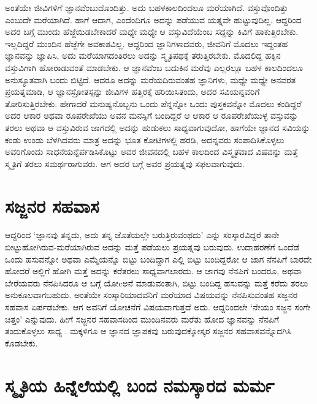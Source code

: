 ಅಂತೆಯೇ ಜೀವಿಗಳಿಗೆ ಜ್ಞಾನವೆಂಬುದೊಂದಿತ್ತು. ಅದು ಬಹಳಕಾಲದಿಂದಲೂ ಮರೆಯಾಗಿದೆ. ವಸ್ತುವೊಂದಿತ್ತು ಎಂಬುದೇ ಮರೆಯಾಗಿದೆ. ಹಾಗೆ ಆದಾಗ, ಎಂದೆಂದಿಗೂ ಅದನ್ನು ಪಡೆಯುವ ಯತ್ನವೇ ಹುಟ್ಟುವುದಿಲ್ಲ. ಆದ್ದರಿಂದ ಅದರ ಬಗ್ಗೆ ಮುಂದು ಹೆಜ್ಜೆಯಿಡಬೇಕಾದರೆ ಮಧ್ಯೇ ಮಧ್ಯೇ ಆ ವಸ್ತುವಿದೆಯೆಂಬ ಸದ್ದನ್ನು ಕಿವಿಗೆ ಹಾಕುತ್ತಿರಬೇಕು. ಇಲ್ಲದಿದ್ದರೆ ಮುಂದಿನ ಹೆಜ್ಜೆಗೇ ಅವಕಾಶವಿಲ್ಲ. ಆದ್ದರಿಂದ ಜ್ಞಾನಿಗಳಾದವರು, ಜೀವನಿಗೆ ಮೊದಲು ಇದ್ದಂತಹ ಜ್ಞಾನವನ್ನು ಜ್ಞಾಪಿಸಿ, ಅದು ಮರೆಯಾಗದಂತಿರಲು ಅದನ್ನು ಸ್ಮೃತಿಪಥಕ್ಕೆ ತರುತ್ತಿರಬೇಕು. ಮೊದಲಿದ್ದ ಹಕ್ಕಿನ ವಸ್ತುವಿಗಾಗಿ ಹೋರಾಡುವಂತೆ ಮಾಡಬೇಕು. ಆ ಜ್ಞಾನವೆಂಬ ಬದುಕಿನ ಮರೆವು ಎಲ್ಲರಲ್ಲೂ ಬಹಳ ಕಾಲದಿಂದಲೂ ಅನುಸ್ಯೂತವಾಗಿ ಬಂದು ಬಿಟ್ಟಿದೆ. ಆದರೂ ಅದನ್ನು ಮರೆಯದಿರುವಂತಹ ಜ್ಞಾನಿಗಳು, ಮಧ್ಯೇ ಮಧ್ಯೇ ಅನವರತ ಪ್ರಯತ್ನಮಾಡಿ, ಆ ಜ್ಞಾನಸ್ರೋತಸ್ಸನ್ನು ಜೀವಿಗಳ ಹತ್ತಿರಕ್ಕೆ ಹರಿಯಿಸಿತಂದು, ಅದರ ಸವಿಯನ್ನವರಿಗೆ ತೋರಿಸುತ್ತಿರಬೇಕು. ಹೇಗಾದರೆ ಮನುಷ್ಯನೊಬ್ಬನು ಒಂದು ಪೆನ್ನನ್ನೋ ಒಂದು ಪುಸ್ತಕವನ್ನೋ ಮೊದಲು ಕಂಡಿದ್ದರೆ ಅದರ ಆಕಾರ ಅಥವಾ ರೂಪರೇಖೆಯು ಅವನ ಮನಸ್ಸಿಗೆ ಬಂದಿದ್ದರೆ ಆ ಆಕಾರ ಆ ರೂಪರೇಖೆಯುಳ್ಳ ವಸ್ತುವನ್ನು ತರಲು ಅಥವಾ ಆ ವಸ್ತುವಿರುವ ಜಾಗದಲ್ಲಿ ಅದನ್ನು ಹುಡುಕಲು ಸಾಧ್ಯವಾಗುವುದೋ, ಹಾಗೆಯೇ ಜ್ಞಾನದ ಸವಿಯನ್ನು ಕಂಡು ಉಂಡು ಬೆಳಗಿದವರು ಮಾತ್ರ ಅದನ್ನು ಭೂತ ಕೋಟಿಗಳಲ್ಲಿ ಹರಡಿ, ಅದನ್ನವರು ಸಂಪಾದಿಸಿಕೊಳ್ಳಲು ಅವರಿಗೊಂದು ಸಾಧನೆಯನ್ನೆರ್ಪಡಿಸಿಕೊಟ್ಟು ಅವರ ಜೀವನದಲ್ಲಿ ಬಹಳ ಕಾಲದಿಂದ ವಿಸ್ಮೃತವಾದ ವಿಷವನ್ನು ಮತ್ತೆ ಸ್ಮೃತಿಗೆ ತರಲು ಸಮರ್ಥರಾಗುವರು. ಆಗ ಅದರ ಬಗ್ಗೆ ಅವರ ಪ್ರಯತ್ನವು ಸಫಲವಾಗುವುದು.

\section*{ಸಜ್ಜನರ ಸಹವಾಸ}
  
ಆದ್ದರಿಂದ `ಜ್ಞಾನವು ತನ್ನದು, ಅದು ತನ್ನ ಜೊತೆಯಲ್ಲೇ ಬರುತ್ತಿರುವಂಥದು' ಎನ್ನು ಸಂಸ್ಕಾರವಿದ್ದರೆ ತಾನೇ ಬೀಟ್ಟುಹೋಗಿರುವ-ಮರೆಯಾಗಿರುವ ಅದನ್ನು ಮತ್ತೆ ಪಡೆಯಲು ಪ್ರಯತ್ನವು ಬರುವುದು. ಉದಾಹರಣೆಗೆ ಒಂದೆಡೆ ಒಂದು ಹಸುವನ್ನೋ ಅಥವಾ ಎಮ್ಮೆಯನ್ನೊ ಬಿಟ್ಟು ಬಂದಿದ್ದಾಗ ಎಲ್ಲಿ ಬಿಟ್ಟು ಬಂದಿದ್ದರೋ ಆ ಜಾಗ ನೆನಪಿಗೆ ಬಾರದೇ ಹೋದರೆ ಅಲ್ಲಿಗೆ ಹೋಗಿ ಮತ್ತೆ ಅದನ್ನು ಕರೆತರಲು ಸಾಧ್ಯವಾಗಲಾರದು. ಆ ಜಾಗವು ನೆನಪಿಗೆ ಬಂದರೂ, ಅಥವಾ ಬೇರೆಯವರು ನೆನಪಿಸಿದರೂ ಆ ಬಗ್ಗೆ ಯೋcಅನೆ ಮಾಡುವಂತಾಗಿ, ಬಿಟ್ಟು ಬಂದಿದ್ದ ಹಸುವನ್ನು ಮತ್ತೆ ಕರೆದು ತರಲು ಅನುಕೂಲವಾಗಬಹುದು. ಅಂತೆಯೇ ಸಂಸ್ಕಾರಿಯಾದವನಿಗೆ ಮರೆಯಾದ ವಿಷಯವನ್ನು ನೆನಪಿಸುವಂತಹ ಸಜ್ಜನರ ಸಹವಾಸ ಏರ್ಪಡಬೇಕು. ಆಗ ಅವನಿಗೆ ಯೋಚನೆಗೆ ವಿಷಯವಾಗುತ್ತದೆ ಅದು. ಆದ್ದರಿಂದಲೇ `ನೇಯಂ ಸಜ್ಜನ ಸಂಗೇ ಚಿತ್ತಂ'\label{83} ಎನ್ನುವುದು. ಹೀಗೆ ಸಜ್ಜನರ ಸಹವಾಸದಿಂದ ಮುಂದಿನವರು ಮರೆತು ಹೋದ ಜ್ಞಾನವನ್ನು ನೆನಪಿಗೆ ತಂದುಕೊಳ್ಳಲು ಸಾಧ್ಯ . ಮಕ್ಕಳಿಗೂ ಆ ಜ್ಞಾನದ ಜ್ಞಾಪಕವು ಬರುವುದಕ್ಕೋಸ್ಕರ ಸಜ್ಜನರ ಸಹವಾಸವನ್ನೊದಗಿಸಿ ಕೊಡಬೇಕು. 

\section*{ಸ್ಮೃತಿಯ ಹಿನ್ನೆಲೆಯಲ್ಲಿ ಬಂದ ನಮಸ್ಕಾರದ ಮರ್ಮ}

